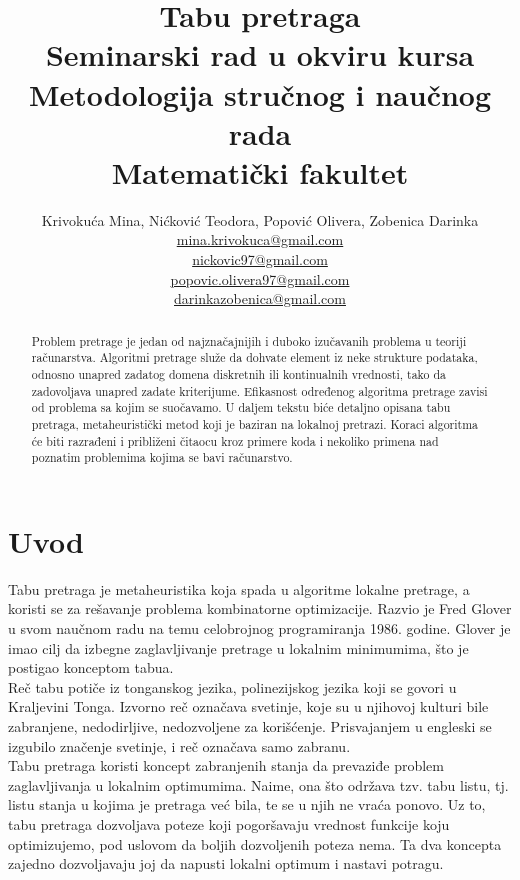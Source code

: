 \documentclass[a4paper]{article}
\title{Tabu pretraga\\ \small{Seminarski rad u okviru kursa\\Metodologija stručnog i naučnog rada\\ Matematički fakultet}}
\author{Krivokuća Mina, Nićković Teodora, Popović Olivera, Zobenica Darinka\\ \href{mailto:mina.krivokuca@gmail.com}{mina.krivokuca@gmail.com}\\ \href{mailto:nickovic97@gmail.com}{nickovic97@gmail.com}\\
\href{mailto:popovic.olivera97@gmail.com}{popovic.olivera97@gmail.com}\\
\href{mailto:darinkazobenica@gmail.com}{darinkazobenica@gmail.com}}
\date{}
\begin{document}
\maketitle


\begin{abstract}
Problem pretrage je jedan od najznačajnijih i duboko izučavanih problema u teoriji računarstva. Algoritmi pretrage služe da dohvate element iz neke strukture podataka, odnosno unapred zadatog domena diskretnih ili kontinualnih vrednosti, tako da zadovoljava unapred zadate kriterijume. Efikasnost određenog algoritma pretrage zavisi od problema sa kojim se suočavamo. U daljem tekstu biće detaljno opisana tabu pretraga, metaheuristički metod koji je baziran na lokalnoj pretrazi. Koraci algoritma će biti razrađeni i približeni čitaocu kroz primere koda i nekoliko primena nad poznatim problemima kojima se bavi računarstvo.
\end{abstract}

\tableofcontents
\newpage

\section{Uvod}
Tabu pretraga je metaheuristika koja spada u algoritme lokalne pretrage, a koristi se za rešavanje problema kombinatorne optimizacije. \cite{glovertutorial} Razvio je Fred Glover u svom naučnom radu na temu celobrojnog programiranja 1986. godine. \cite{eureka} Glover je imao cilj da izbegne zaglavljivanje pretrage u lokalnim minimumima, što je postigao konceptom tabua.\\

Reč tabu potiče iz tonganskog jezika, polinezijskog jezika koji se govori u Kraljevini Tonga. Izvorno reč označava svetinje, koje su u njihovoj kulturi bile zabranjene, nedodirljive, nedozvoljene za korišćenje. Prisvajanjem u engleski se izgubilo značenje svetinje, i reč označava samo zabranu. \cite{tabueth}\\

Tabu pretraga koristi koncept zabranjenih stanja da prevaziđe problem zaglavljivanja u lokalnim optimumima. Naime, ona što održava tzv. tabu listu, tj. listu stanja u kojima je pretraga već bila, te se u njih ne vraća ponovo. Uz to, tabu pretraga dozvoljava poteze koji pogoršavaju vrednost funkcije koju optimizujemo, pod uslovom da boljih dozvoljenih poteza nema. Ta dva koncepta zajedno dozvoljavaju joj da napusti lokalni optimum i nastavi potragu. \cite{tabusearchbook}\\
\end{document}
